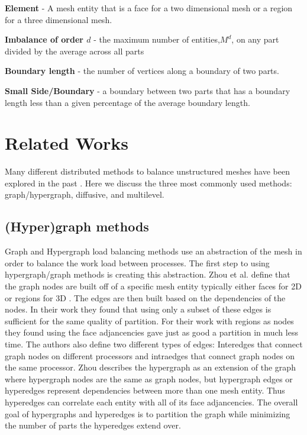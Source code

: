 \documentclass{thesis}
\begin{document}
{\bf Element} - A mesh entity that is a face for a two dimensional mesh or a region for a three dimensional mesh.

{\bf Imbalance of order $d$} - the maximum number of entities,$M^d$, on any part divided by the average across all parts

{\bf Boundary length} - the number of vertices along a boundary of two parts.

{\bf Small Side/Boundary} - a boundary between two parts that has a boundary length less than a given percentage of the average boundary length.


\chapter{Related Works}
Many different distributed methods to balance unstructured meshes have been 
explored in the past \cite{multidiffuse,surveygraph}. Here we discuss the 
three most commonly used methods: graph/hypergraph, diffusive, and multilevel.

\section{(Hyper)graph methods}
Graph and Hypergraph load balancing methods use an abstraction of the mesh in 
order to balance the work load between processes. The first step to using 
hypergraph/graph methods is creating this abstraction. Zhou et al. define that 
the graph nodes are built off of a specific mesh entity typically either faces 
for 2D or regions for 3D \cite{zhougraph}. The edges are then built based on the
dependencies of the nodes. In their work they found that using only a subset of 
these edges is sufficient for the same quality of partition. For their work with
regions as nodes they found using the face adjancencies gave just as good a 
partition in much less time. The authors also define two different types of 
edges: Interedges that connect graph nodes on different processors and 
intraedges that connect graph nodes on the same processor. Zhou describes the 
hypergraph as an extension of the graph where hypergraph nodes are the same as 
graph nodes, but hypergraph edges or hyperedges represent dependencies between 
more than one mesh entity. Thus hyperedges can correlate each entity with all 
of its face adjancencies. The overall goal of hypergraphs and hyperedges is to 
partition the graph while minimizing the number of parts the hyperedges extend 
over.
\end{document}
